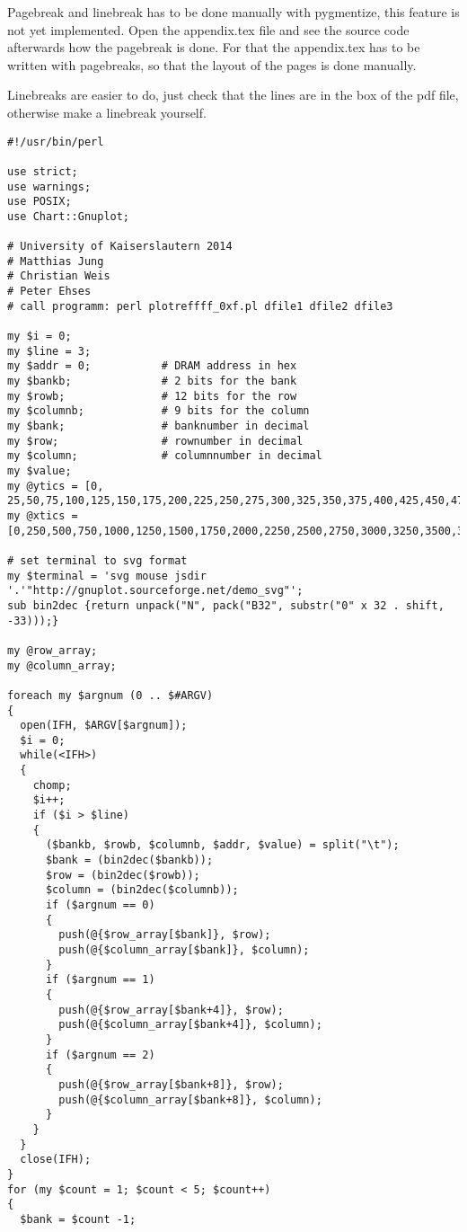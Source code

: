 \pagebreak
Pagebreak and linebreak has to be done manually with pygmentize, this feature is
not yet implemented. Open the appendix.tex file and see the source code
afterwards how the pagebreak is done. For that the appendix.tex has to be
written with pagebreaks, so that the layout of the pages is done manually.

Linebreaks are easier to do, just check that the lines are in the box of the pdf
file, otherwise make a linebreak yourself.
\pagebreak

\begin{verbatim}
#!/usr/bin/perl

use strict;
use warnings;
use POSIX;
use Chart::Gnuplot;

# University of Kaiserslautern 2014
# Matthias Jung 
# Christian Weis
# Peter Ehses
# call programm: perl plotreffff_0xf.pl dfile1 dfile2 dfile3

my $i = 0;
my $line = 3;
my $addr = 0;           # DRAM address in hex
my $bankb;              # 2 bits for the bank
my $rowb;               # 12 bits for the row
my $columnb;            # 9 bits for the column
my $bank;               # banknumber in decimal
my $row;                # rownumber in decimal
my $column;             # columnnumber in decimal
my $value;
my @ytics = [0, 25,50,75,100,125,150,175,200,225,250,275,300,325,350,375,400,425,450,475,500];
my @xtics = [0,250,500,750,1000,1250,1500,1750,2000,2250,2500,2750,3000,3250,3500,3750,4000];

# set terminal to svg format
my $terminal = 'svg mouse jsdir '.'"http://gnuplot.sourceforge.net/demo_svg"';
sub bin2dec {return unpack("N", pack("B32", substr("0" x 32 . shift, -33)));}

my @row_array;
my @column_array;

foreach my $argnum (0 .. $#ARGV)
{
  open(IFH, $ARGV[$argnum]);
  $i = 0;
  while(<IFH>)
  { 
    chomp;
    $i++;
    if ($i > $line)
    {
      ($bankb, $rowb, $columnb, $addr, $value) = split("\t");	
      $bank = (bin2dec($bankb));
      $row = (bin2dec($rowb));
      $column = (bin2dec($columnb));
      if ($argnum == 0)
      {
        push(@{$row_array[$bank]}, $row);
        push(@{$column_array[$bank]}, $column);
      }
      if ($argnum == 1)
      {
        push(@{$row_array[$bank+4]}, $row);
        push(@{$column_array[$bank+4]}, $column);
      }
      if ($argnum == 2)
      {
        push(@{$row_array[$bank+8]}, $row);
        push(@{$column_array[$bank+8]}, $column);
      }
    }
  }
  close(IFH);
}
for (my $count = 1; $count < 5; $count++)
{
  $bank = $count -1;
\end{verbatim}


